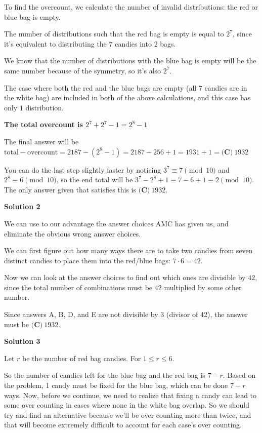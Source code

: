 \begin{enumerate}
 
To find the overcount, we calculate the number of invalid distributions: the red or blue bag is empty. 

 The number of distributions such that the red bag is empty is equal to $2^7$, since it's equivalent to distributing the $7$ candies into $2$ bags.

 We know that the number of distributions with the blue bag is empty will be the same number because of the symmetry, so it's also $2^7$. 

 The case where both the red and the blue bags are empty (all $7$ candies are in the white bag) are included in both of the above calculations, and this case has only $1$ distribution.

 \textbf{The total overcount is $2^7+2^7-1=2^8-1$}

 
The final answer will be $\text{total}-\text{overcount}=2187-(2^8-1) = 2187-256+1=1931+1=\boxed{\textbf{(C)}\ 1932}$

 You can do the last step slightly faster by noticing $3^7 \equiv 7 \pmod{10}$ and $2^8 \equiv 6 \pmod{10}$, so the end total will be $3^7 - 2^8 +1 \equiv 7 - 6 + 1 \equiv 2 \pmod{10}$. The only answer given that satisfies this is $\boxed{\textbf{(C)}\ 1932}$.

 



\textbf{Solution 2}

We can use to our advantage the answer choices $\text{AMC}$ has given us, and eliminate the obvious wrong answer choices.

 We can first figure out how many ways there are to take two candies from seven distinct candies to place them into the red/blue bags: $7\cdot 6=42$.

 Now we can look at the answer choices to find out which ones are divisible by $42$, since the total number of combinations must be $42$ multiplied by some other number.

 Since answers A, B, D, and E are not divisible by 3 (divisor of 42), the answer must be $\boxed{\textbf{(C)}\ 1932}$.

 



\textbf{Solution 3}

Let $r$ be the number of red bag candies. For ${1 \leq r \leq 6}$. 

 So the number of candies left for the blue bag and the red bag is $7-r$. Based on the problem, 1 candy must be fixed for the blue bag, which can be done $7-r$ ways. Now, before we continue, we need to realize that fixing a candy can lead to some over counting in cases where none in the white bag overlap. So we should try and find an alternative because we'll be over counting more than twice, and that will become extremely difficult to account for each case's over counting. 


\end{enumerate}
